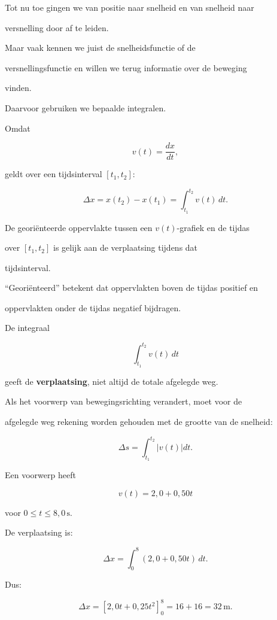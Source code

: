\documentclass{ximera}
\begin{document}

Tot nu toe gingen we van positie naar snelheid en van snelheid naar

versnelling door af te leiden.

Maar vaak kennen we juist de snelheidsfunctie of de

versnellingsfunctie en willen we terug informatie over de beweging

vinden.

Daarvoor gebruiken we bepaalde integralen.


Omdat

\[v(t)=\frac{dx}{dt},\]

geldt over een tijdsinterval $[t_1,t_2]$:

\[\boxed{ \Delta x = x(t_2)-x(t_1) = \int_{t_1}^{t_2}v(t)\,dt. }\]

\begin{eigenschap}

De georiënteerde oppervlakte tussen een $v(t)$-grafiek en de tijdas

over $[t_1,t_2]$ is gelijk aan de verplaatsing tijdens dat

tijdsinterval.

\end{eigenschap}

``Georiënteerd'' betekent dat oppervlakten boven de tijdas positief en

oppervlakten onder de tijdas negatief bijdragen.

\begin{opmerking}

De integraal

\[\int_{t_1}^{t_2}v(t)\,dt\]

geeft de \textbf{verplaatsing}, niet altijd de totale afgelegde weg.

Als het voorwerp van bewegingsrichting verandert, moet voor de

afgelegde weg rekening worden gehouden met de grootte van de snelheid:

\[\Delta s = \int_{t_1}^{t_2}|v(t)|dt.\]

\end{opmerking}

\begin{voorbeeld}

Een voorwerp heeft

\[v(t)=2,0+0,50t\]

voor $0\leq t\leq8,0\,\mathrm{s}$.

De verplaatsing is:

\[\Delta x = \int_0^8(2,0+0,50t)\,dt.\]

Dus:

\[\Delta x = \left[2,0t+0,25t^2\right]_0^8 = 16+16 = 32\,\mathrm{m}.\]

\end{voorbeeld}
\end{document}
